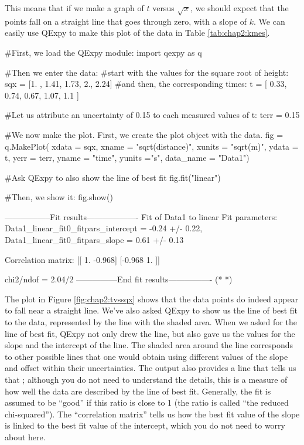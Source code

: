 This means that if we make a graph of $t$ versus $\sqrt{x}$, we should expect that the points fall on a straight line that goes through zero, with a slope of $k$. We can easily use QExpy to make this plot of the data in Table \ref{tab:chap2:kmes}.
\begin{python}[caption=Using QExPy for plotting]
#First, we load the QExpy module:
import qexpy as q

#Then we enter the data:
#start with the values for the square root of height:
sqx = [1. , 1.41, 1.73, 2., 2.24]
#and then, the corresponding times:
t = [ 0.33,  0.74,  0.67,  1.07,  1.1 ]

#Let us attribute an uncertainty of 0.15 to each measured values of t:
terr = 0.15

#We now make the plot. First, we create the plot object with the data.
fig = q.MakePlot( xdata = sqx, xname = "sqrt(distance)", xunits = "sqrt(m)",
                  ydata = t, yerr = terr, yname = "time", yunits ="s",
                  data_name = "Data1")
                  
#Ask QExpy to also show the line of best fit                  
fig.fit("linear")
                  
#Then, we show it:
fig.show()         
\end{python}
\begin{poutput}
-----------------Fit results-------------------
Fit of  Data1  to  linear
Fit parameters:
Data1_linear_fit0_fitpars_intercept = -0.24 +/- 0.22,
Data1_linear_fit0_fitpars_slope = 0.61 +/- 0.13

Correlation matrix: 
[[ 1.    -0.968]
 [-0.968  1.   ]]

chi2/ndof = 2.04/2
---------------End fit results----------------
(*  *)
\end{poutput}
The plot in Figure \ref{fig:chap2:tvssqx} shows that the data points do indeed appear to fall near a straight line. We've also asked QExpy to show us the line of best fit to the data, represented by the line with the shaded area. When we asked for the line of best fit, QExpy not only drew the line, but also gave us the values for the slope and the intercept of the line. The shaded area around the line corresponds to other possible lines that one would obtain using different values of the slope and offset within their uncertainties. The output also provides a line that tells us that ; although you do not need to understand the details, this is a measure of how well the data are described by the line of best fit. Generally, the fit is assumed to be ``good'' if this ratio is close to 1 (the ratio is called ``the reduced chi-squared'').  The ``correlation matrix'' tells us how the best fit value of the slope is linked to the best fit value of the intercept, which you do not need to worry about here.


